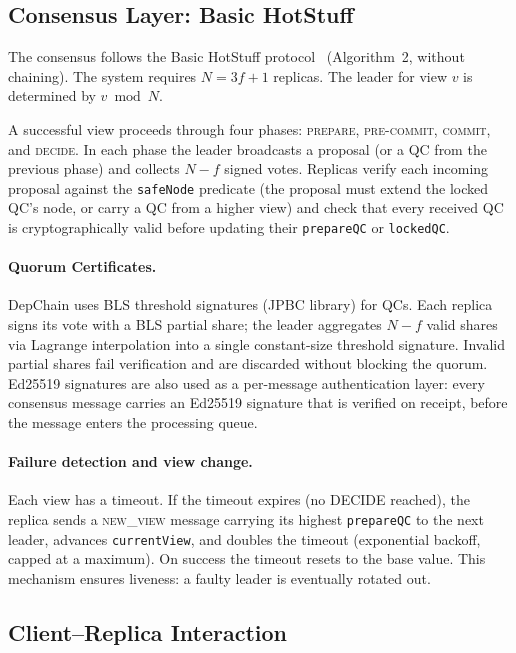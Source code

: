 \documentclass{llncs}
\begin{document}
\subsection{Consensus Layer: Basic HotStuff}

The consensus follows the Basic HotStuff protocol~\cite{hotstuff} (Algorithm~2, without chaining). The system requires $N = 3f + 1$ replicas. The leader for view $v$ is determined by $v \bmod N$.

A successful view proceeds through four phases: \textsc{prepare}, \textsc{pre-commit}, \textsc{commit}, and \textsc{decide}. In each phase the leader broadcasts a proposal (or a QC from the previous phase) and collects $N{-}f$ signed votes. Replicas verify each incoming proposal against the \texttt{safeNode} predicate (the proposal must extend the locked QC's node, or carry a QC from a higher view) and check that every received QC is cryptographically valid before updating their \texttt{prepareQC} or \texttt{lockedQC}.

\paragraph{Quorum Certificates.} DepChain uses BLS threshold signatures (JPBC library) for QCs. Each replica signs its vote with a BLS partial share; the leader aggregates $N{-}f$ valid shares via Lagrange interpolation into a single constant-size threshold signature. Invalid partial shares fail verification and are discarded without blocking the quorum. Ed25519 signatures are also used as a per-message authentication layer: every consensus message carries an Ed25519 signature that is verified on receipt, before the message enters the processing queue.

\paragraph{Failure detection and view change.} Each view has a timeout. If the timeout expires (no DECIDE reached), the replica sends a \textsc{new\_view} message carrying its highest \texttt{prepareQC} to the next leader, advances \texttt{currentView}, and doubles the timeout (exponential backoff, capped at a maximum). On success the timeout resets to the base value. This mechanism ensures liveness: a faulty leader is eventually rotated out.

\subsection{Client--Replica Interaction}
\end{document}
